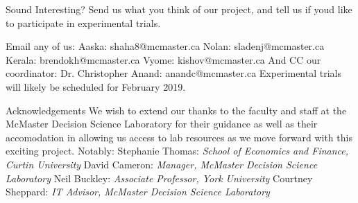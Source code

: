 \documentclass[22pt]{beamer}
\begin{document}
\begin{frame}[fragile]
\begin{textblock}{7.25}
\begin{block}{Sound Interesting?}\newline
Send us what you think of our project, and tell us if you\textsc{}d like to participate in experimental trials.

\newline
\newline
Email any of us: \newline
\newline
Aaska: shaha8@mcmaster.ca\newline
Nolan: sladenj@mcmaster.ca\newline
Kerala: brendokh@mcmaster.ca\newline
Vyome: kishov@mcmaster.ca\newline
\newline
And CC our coordinator:\newline
Dr. Christopher Anand: anandc@mcmaster.ca
\newline
\newline
Experimental trials will likely be scheduled for February 2019.
\end{block}


\begin{block}{Acknowledgements}\newline
We wish to extend our thanks to the faculty and staff at the McMaster Decision Science Laboratory for their guidance as well as their accomodation in allowing us access to lab resources as we move forward with this exciting project. Notably:\newline
\newline
Stephanie Thomas: \textit{School of Economics and Finance, Curtin University}\newline
David Cameron: \textit{Manager, McMaster Decision Science Laboratory}\newline
Neil Buckley: \textit{Associate Professor, York University}\newline
Courtney Sheppard: \textit{IT Advisor, McMaster Decision Science Laboratory}
\end{block}

% 

\begin{comment}
\begin{block}{References}
\setbeamertemplate{bibliography item}{\insertbiblabel}

{\scriptsize
}
\end{block}
\vspace{-1.8mm}
\end{comment}
\end{textblock}


\end{frame}
\end{document}
